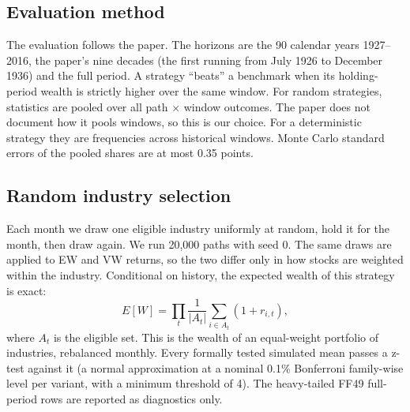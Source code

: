 \documentclass[11pt,letterpaper]{article}
\newcommand{\tablefont}{\footnotesize\setlength{\tabcolsep}{3.4pt}}
\begin{document}
\subsection{Evaluation method}

The evaluation follows the paper. The horizons are the 90 calendar years 1927--2016, the paper's nine decades (the
first running from July 1926 to December 1936) and the full period. A strategy ``beats'' a benchmark when its
holding-period wealth is strictly higher over the same window. For random strategies, statistics are pooled over
all path $\times$ window outcomes. The paper does not document how it pools windows, so this is our choice. For a
deterministic strategy they are frequencies across historical windows. Monte Carlo standard errors of the pooled
shares are at most 0.35 points.

\subsection{Random industry selection}\label{sec:random}

Each month we draw one eligible industry uniformly at random, hold it for the month, then draw again. We run
20,000 paths with seed 0. The same draws are applied to EW and VW returns, so the two differ only in how stocks are
weighted within the industry. Conditional on history, the expected wealth of this strategy is exact:
\begin{equation}
  E[W] = \prod_t \frac{1}{|A_t|}\sum_{i \in A_t} (1 + r_{i,t}),
  \label{eq:exact}
\end{equation}
where $A_t$ is the eligible set. This is the wealth of an equal-weight portfolio of industries, rebalanced monthly.
Every formally tested simulated mean passes a z-test against it (a normal approximation at a nominal 0.1\%
Bonferroni family-wise level per variant, with a minimum threshold of 4). The heavy-tailed FF49 full-period rows are
reported as diagnostics only.

\begin{table}[!htbp]
  \centering\tablefont
  \caption{Table~4 with \textbf{random industries} in place of random stocks (20,000 paths, July 1926 to December
    2016). ``Ours'' is pooled across paths and windows. The paper's columns are its 1-, 5-, 25-, 50- and 100-stock
    portfolios. Full-period mean and median are in whole percent. Skewness values are Monte Carlo estimates; the
    FF49 full-period values are especially sensitive to rare paths (exact values 80.3 EW and 78.6 VW).}
  \label{tab:table4}
  
\end{table}
\end{document}
